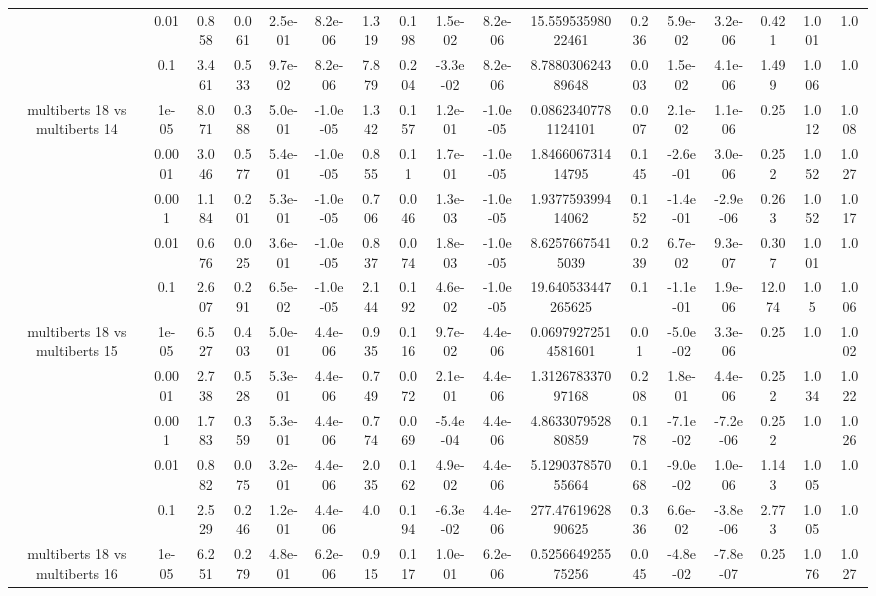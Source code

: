\begin{tabular}{|c|c|c|c|c|c|c|c|c|c|c|c|c|c|c|c|c|}
 & 0.01 & 0.858 & 0.061 & 2.5e-01 & 8.2e-06 & 1.319 & 0.198 & 1.5e-02 & 8.2e-06 & 15.55953598022461 & 0.236 & 5.9e-02 & 3.2e-06 & 0.421 & 1.001 & 1.0 \\
 & 0.1 & 3.461 & 0.533 & 9.7e-02 & 8.2e-06 & 7.879 & 0.204 & -3.3e-02 & 8.2e-06 & 8.788030624389648 & 0.003 & 1.5e-02 & 4.1e-06 & 1.499 & 1.006 & 1.0 \\
\hline
\multirow{5}{*}{multiberts 18 vs multiberts 14} & 1e-05 & 8.071 & 0.388 & 5.0e-01 & -1.0e-05 & 1.342 & 0.157 & 1.2e-01 & -1.0e-05 & 0.08623407781124101 & 0.007 & 2.1e-02 & 1.1e-06 & 0.25 & 1.012 & 1.008 \\
 & 0.0001 & 3.046 & 0.577 & 5.4e-01 & -1.0e-05 & 0.855 & 0.11 & 1.7e-01 & -1.0e-05 & 1.846606731414795 & 0.145 & -2.6e-01 & 3.0e-06 & 0.252 & 1.052 & 1.027 \\
 & 0.001 & 1.184 & 0.201 & 5.3e-01 & -1.0e-05 & 0.706 & 0.046 & 1.3e-03 & -1.0e-05 & 1.937759399414062 & 0.152 & -1.4e-01 & -2.9e-06 & 0.263 & 1.052 & 1.017 \\
 & 0.01 & 0.676 & 0.025 & 3.6e-01 & -1.0e-05 & 0.837 & 0.074 & 1.8e-03 & -1.0e-05 & 8.62576675415039 & 0.239 & 6.7e-02 & 9.3e-07 & 0.307 & 1.001 & 1.0 \\
 & 0.1 & 2.607 & 0.291 & 6.5e-02 & -1.0e-05 & 2.144 & 0.192 & 4.6e-02 & -1.0e-05 & 19.640533447265625 & 0.1 & -1.1e-01 & 1.9e-06 & 12.074 & 1.05 & 1.006 \\
\hline
\multirow{5}{*}{multiberts 18 vs multiberts 15} & 1e-05 & 6.527 & 0.403 & 5.0e-01 & 4.4e-06 & 0.935 & 0.116 & 9.7e-02 & 4.4e-06 & 0.06979272514581601 & 0.01 & -5.0e-02 & 3.3e-06 & 0.25 & 1.0 & 1.002 \\
 & 0.0001 & 2.738 & 0.528 & 5.3e-01 & 4.4e-06 & 0.749 & 0.072 & 2.1e-01 & 4.4e-06 & 1.312678337097168 & 0.208 & 1.8e-01 & 4.4e-06 & 0.252 & 1.034 & 1.022 \\
 & 0.001 & 1.783 & 0.359 & 5.3e-01 & 4.4e-06 & 0.774 & 0.069 & -5.4e-04 & 4.4e-06 & 4.863307952880859 & 0.178 & -7.1e-02 & -7.2e-06 & 0.252 & 1.0 & 1.026 \\
 & 0.01 & 0.882 & 0.075 & 3.2e-01 & 4.4e-06 & 2.035 & 0.162 & 4.9e-02 & 4.4e-06 & 5.129037857055664 & 0.168 & -9.0e-02 & 1.0e-06 & 1.143 & 1.005 & 1.0 \\
 & 0.1 & 2.529 & 0.246 & 1.2e-01 & 4.4e-06 & 4.0 & 0.194 & -6.3e-02 & 4.4e-06 & 277.4761962890625 & 0.336 & 6.6e-02 & -3.8e-06 & 2.773 & 1.005 & 1.0 \\
\hline
\multirow{5}{*}{multiberts 18 vs multiberts 16} & 1e-05 & 6.251 & 0.279 & 4.8e-01 & 6.2e-06 & 0.915 & 0.117 & 1.0e-01 & 6.2e-06 & 0.525664925575256 & 0.045 & -4.8e-02 & -7.8e-07 & 0.25 & 1.076 & 1.027 \\

\end{tabular}
